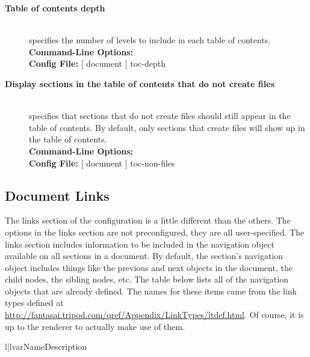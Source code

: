 \documentclass{manual}
\newcommand{\optval}[1]{\textrm{\textit{#1}}}
\newenvironment{configuration}[1]{%
    \newcommand{\default}[1]{\hfill\\\textbf{Default:} ##1}%
    \newcommand{\config}[2]{\hfill\\\textbf{Config File:} [ ##1 ] ##2}%
    \newcommand{\options}[1]{\hfill\\\textbf{Command-Line Options:} %
                                     \texttt{##1}}%
    \begin{description}
    \item[\textbf{#1}] \hfill\\
}{\end{description}}
\begin{document}
\begin{configuration}{Table of contents depth}
specifies the number of levels to include in each table of contents.
\options{\longprogramopt{toc-depth=\optval{integer}}}
\config{document}{toc-depth}
\end{configuration}

\begin{configuration}{Display sections in the table of contents that do not create files}
specifies that sections that do not create files should still appear in the
table of contents.  By default, only sections that create files will show
up in the table of contents.
\options{}
\config{document}{toc-non-files}
\end{configuration}


\subsection{Document Links}

The links section of the configuration is a little different than the
others.  The options in the links section are not preconfigured, they
are all user-specified.  The links section includes information 
to be included in the navigation object available on all sections in 
a document.  By default, the section's navigation object includes things
like the previous and next objects in the document, the child nodes, 
the sibling nodes, etc.  The table below lists all of the navigation
objects that are already defined.  The names for these items came from
the link types defined at \url{http://fantasai.tripod.com/qref/Appendix/LinkTypes/ltdef.html}.  Of course, it is up to the renderer to actually make use
of them.

\begin{tableii}{l|l}{var}{Name}{Description}
\end{tableii}
\end{document}
